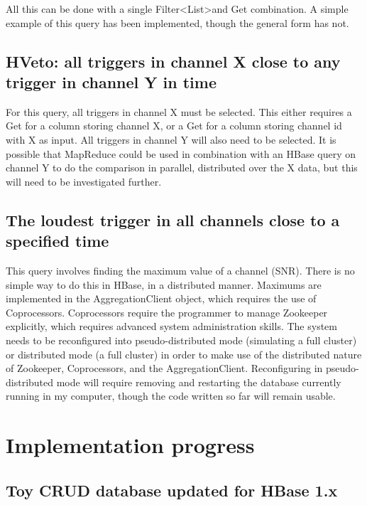 \documentclass{article}
\begin{document}
All this can be done with a single Filter\textless List\textgreater and Get combination. A simple example of this query has been implemented, though the general form has not.

\subsection{HVeto: all triggers in channel X close to any trigger in channel Y in time}
\label{query2}

For this query, all triggers in channel X must be selected. This
either requires a Get for a column storing channel X, or a Get for a
column storing channel id with X as input. All triggers in channel Y
will also need to be selected. It is possible that MapReduce could be
used in combination with an HBase query on channel Y to do the
comparison in parallel, distributed over the X data, but this will
need to be investigated further.


\subsection{The loudest trigger in all channels close to a specified time}
\label{query3}

This query involves finding the maximum value of a channel
(SNR). There is no simple way to do this in HBase, in a distributed
manner. Maximums are implemented in the AggregationClient object,
which requires the use of Coprocessors. Coprocessors require the
programmer to manage Zookeeper explicitly, which requires advanced
system administration skills. The system needs to be reconfigured into
pseudo-distributed mode (simulating a full cluster) or distributed mode
(a full cluster) in order to make use of the distributed nature of
Zookeeper, Coprocessors, and the AggregationClient. Reconfiguring in
pseudo-distributed mode will require removing and restarting the
database currently running in my computer, though the code written so
far will remain usable.



\section{Implementation progress}

\subsection{Toy CRUD database updated for HBase 1.x}
\end{document}
